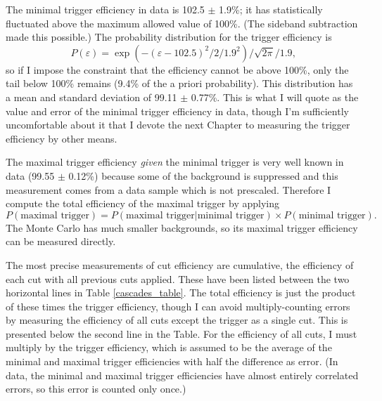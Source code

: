 The minimal trigger efficiency in data is 102.5 $\pm$ 1.9\%; it has
statistically fluctuated above the maximum allowed value of 100\%.
(The sideband subtraction made this possible.)  The probability
distribution for the trigger efficiency is
\begin{equation}
  P(\varepsilon) = \exp(-(\varepsilon - 102.5)^2/2/1.9^2) / \sqrt{2 \pi} / 1.9 \mbox{,}
\end{equation}
so if I impose the constraint that the efficiency cannot be above
100\%, only the tail below 100\% remains (9.4\% of the a priori
probability).  This distribution has a mean and standard deviation of
99.11 $\pm$ 0.77\%.  This is what I will quote as the value and error
of the minimal trigger efficiency in data, though I'm sufficiently
uncomfortable about it that I devote the next Chapter to measuring the
trigger efficiency by other means.

The maximal trigger efficiency {\it given} the minimal trigger is very
well known in data (99.55 $\pm$ 0.12\%) because some of the background
is suppressed and this measurement comes from a data sample which is
not prescaled.  Therefore I compute the total efficiency of the
maximal trigger by applying
\begin{equation}
  P(\mbox{maximal trigger}) = P(\mbox{maximal trigger} | \mbox{minimal
  trigger}) \times P(\mbox{minimal trigger})\mbox{.}
\end{equation}
The Monte Carlo has much smaller backgrounds, so its maximal trigger
efficiency can be measured directly.

The most precise measurements of cut efficiency are cumulative, the
efficiency of each cut with all previous cuts applied.  These have
been listed between the two horizontal lines in Table
\ref{cascades_table}.  The total efficiency is just the product of
these times the trigger efficiency, though I can avoid
multiply-counting errors by measuring the efficiency of all cuts
except the trigger as a single cut.  This is presented below the
second line in the Table.  For the efficiency of all cuts, I must
multiply by the trigger efficiency, which is assumed to be the average
of the minimal and maximal trigger efficiencies with half the
difference as error.  (In data, the minimal and maximal trigger
efficiencies have almost entirely correlated errors, so this error is
counted only once.)

